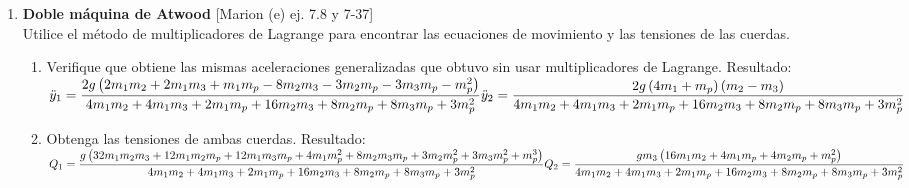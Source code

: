 \documentclass[11pt, spanish, a4paper, twoside]{article}
\begin{document}
\begin{enumerate}
	
	\item
	\begin{minipage}[t][7.5cm]{0.67\textwidth}
	\textbf{Doble máquina de Atwood} [Marion (e) ej. 7.8 y 7-37]\\
	Utilice el método de multiplicadores de Lagrange para encontrar las ecuaciones de movimiento y las tensiones de las cuerdas.
	\begin{enumerate}
		\item Verifique que obtiene las mismas aceleraciones generalizadas que obtuvo sin usar multiplicadores de Lagrange.
		Resultado:\\
		\(
			\ddot{y}_{1} = \dfrac{2 g \left(2 m_{1} m_{2} + 2 m_{1} m_{3} + m_{1} m_{p} - 8 m_{2} m_{3} - 3 m_{2} m_{p} - 3 m_{3} m_{p} - m_{p}^{2}\right)}{4 m_{1} m_{2} + 4 m_{1} m_{3} + 2 m_{1} m_{p} + 16 m_{2} m_{3} + 8 m_{2} m_{p} + 8 m_{3} m_{p} + 3 m_{p}^{2}}\\
			\ddot{y}_{2} = \dfrac{2 g \left(4 m_{1} + m_{p}\right) \left(m_{2} - m_{3}\right)}{4 m_{1} m_{2} + 4 m_{1} m_{3} + 2 m_{1} m_{p} + 16 m_{2} m_{3} + 8 m_{2} m_{p} + 8 m_{3} m_{p} + 3 m_{p}^{2}}
		\)
		\item Obtenga las tensiones de ambas cuerdas.
			Resultado:\\
			\(
				Q_{1} = \dfrac{g \left(32 m_{1} m_{2} m_{3} + 12 m_{1} m_{2} m_{p} + 12 m_{1} m_{3} m_{p} + 4 m_{1} m_{p}^{2} + 8 m_{2} m_{3} m_{p} + 3 m_{2} m_{p}^{2} + 3 m_{3} m_{p}^{2} + m_{p}^{3}\right)}{4 m_{1} m_{2} + 4 m_{1} m_{3} + 2 m_{1} m_{p} + 16 m_{2} m_{3} + 8 m_{2} m_{p} + 8 m_{3} m_{p} + 3 m_{p}^{2}}\\
				Q_{2} = \dfrac{g m_{3} \left(16 m_{1} m_{2} + 4 m_{1} m_{p} + 4 m_{2} m_{p} + m_{p}^{2}\right)}{4 m_{1} m_{2} + 4 m_{1} m_{3} + 2 m_{1} m_{p} + 16 m_{2} m_{3} + 8 m_{2} m_{p} + 8 m_{3} m_{p} + 3 m_{p}^{2}}
			\)
		\end{enumerate}
	\end{minipage}
	\begin{minipage}[c][3cm][t]{0.3\textwidth}
		
	\end{minipage}

	\newpage


\end{enumerate}
\end{document}

